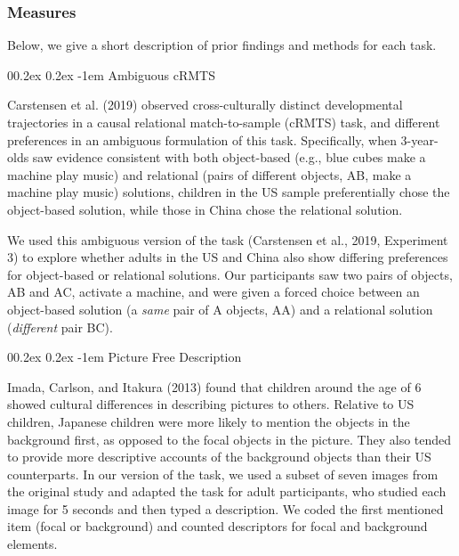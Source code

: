 \documentclass[
  man,floatsintext]{apa6}
\makeatletter
\let\oldparagraph\paragraph
\renewcommand{\paragraph}[1]{\oldparagraph{#1}\mbox{}}
\renewcommand{\paragraph}{\@startsection{paragraph}{4}{\parindent}%
  {0\baselineskip \@plus 0.2ex \@minus 0.2ex}%
  {-1em}%
  {\normalfont\normalsize\bfseries\itshape\typesectitle}}
\makeatother
\begin{document}
\hypertarget{measures}{%
\subsubsection{Measures}\label{measures}}

Below, we give a short description of prior findings and methods for each task.

\hypertarget{ambiguous-crmts}{%
\paragraph{Ambiguous cRMTS}\label{ambiguous-crmts}}

Carstensen et al. (2019) observed cross-culturally distinct developmental trajectories in a causal relational match-to-sample (cRMTS) task, and different preferences in an ambiguous formulation of this task. Specifically, when 3-year-olds saw evidence consistent with both object-based (e.g., blue cubes make a machine play music) and relational (pairs of different objects, AB, make a machine play music) solutions, children in the US sample preferentially chose the object-based solution, while those in China chose the relational solution.

We used this ambiguous version of the task (Carstensen et al., 2019, Experiment 3) to explore whether adults in the US and China also show differing preferences for object-based or relational solutions. Our participants saw two pairs of objects, AB and AC, activate a machine, and were given a forced choice between an object-based solution (a \emph{same} pair of A objects, AA) and a relational solution (\emph{different} pair BC).

\hypertarget{picture-free-description}{%
\paragraph{Picture Free Description}\label{picture-free-description}}

Imada, Carlson, and Itakura (2013) found that children around the age of 6 showed cultural differences in describing pictures to others. Relative to US children, Japanese children were more likely to mention the objects in the background first, as opposed to the focal objects in the picture. They also tended to provide more descriptive accounts of the background objects than their US counterparts. In our version of the task, we used a subset of seven images from the original study and adapted the task for adult participants, who studied each image for 5 seconds and then typed a description. We coded the first mentioned item (focal or background) and counted descriptors for focal and background elements.
\end{document}
